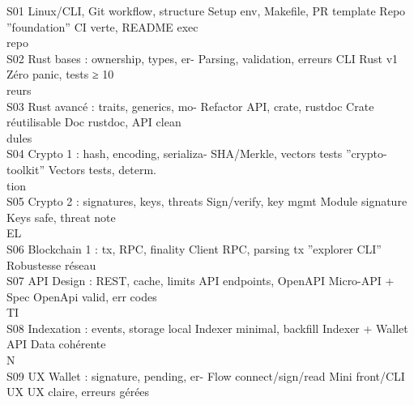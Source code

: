 \documentclass[12pt,landscape,a4paper]{article}
\begin{document}
S01    Linux/CLI, Git workflow, structure Setup env, Makefile, PR template   Repo ”foundation”         CI verte, README exec\\
repo\\
S02    Rust bases : ownership, types, er- Parsing, validation, erreurs       CLI Rust v1               Zéro panic, tests ≥ 10\\
reurs\\
S03    Rust avancé : traits, generics, mo- Refactor API, crate, rustdoc      Crate réutilisable        Doc rustdoc, API clean\\
dules\\
S04    Crypto 1 : hash, encoding, serializa- SHA/Merkle, vectors tests       ”crypto-toolkit”          Vectors tests, determ.\\
tion\\
S05    Crypto 2 : signatures, keys, threats Sign/verify, key mgmt            Module signature          Keys safe, threat note\\
\vspace{0.5em}
\vspace{0.5em}
\vspace{0.5em}
\vspace{0.5em}
EL\\
S06    Blockchain 1 : tx, RPC, finality      Client RPC, parsing tx          ”explorer CLI”            Robustesse réseau\\
S07    API Design : REST, cache, limits      API endpoints, OpenAPI          Micro-API + Spec          OpenApi valid, err codes\\
\vspace{0.5em}
\vspace{0.5em}
\vspace{0.5em}
\vspace{0.5em}
TI\\
S08    Indexation : events, storage local    Indexer minimal, backfill       Indexer + Wallet API      Data cohérente\\
\vspace{0.5em}
\vspace{0.5em}
\vspace{0.5em}
\vspace{0.5em}
N\\
S09    UX Wallet : signature, pending, er- Flow connect/sign/read            Mini front/CLI UX         UX claire, erreurs gérées\\
\vspace{0.5em}
\vspace{0.5em}
\vspace{0.5em}
\end{document}
